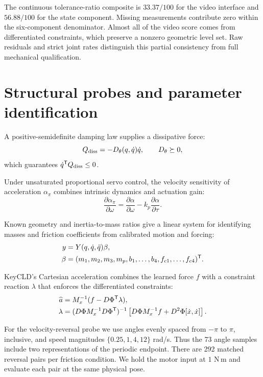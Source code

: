 The continuous tolerance-ratio composite is $33.37/100$ for the video interface and $56.88/100$ for the state component. Missing measurements contribute zero within the six-component denominator. Almost all of the video score comes from differentiated constraints, which preserve a nonzero geometric level set. Raw residuals and strict joint rates distinguish this partial consistency from full mechanical qualification.

\section{Structural probes and parameter identification}
\label{app:probes}
A positive-semidefinite damping law supplies a dissipative force:
\begin{equation}
Q_{\rm diss}=-D_\theta(q,\dot q)\dot q,\qquad D_\theta\succeq0,
\label{eq:design-dissipation}
\end{equation}
which guarantees $\dot q^{\mathsf T} Q_{\rm diss}\leq0$.

Under unsaturated proportional servo control, the velocity sensitivity of acceleration $\alpha_\pi$ combines intrinsic dynamics and actuation gain:
\begin{equation}
\frac{\partial\alpha_\pi}{\partial\omega}
=\frac{\partial\alpha}{\partial\omega}
-k_p\frac{\partial\alpha}{\partial\tau}.
\label{eq:controller-confound}
\end{equation}

Known geometry and inertia-to-mass ratios give a linear system for identifying masses and friction coefficients from calibrated motion and forcing:
\begin{equation}
\begin{aligned}
y&=Y(q,\dot q,\ddot q)\beta,\\
\beta&=(m_1,m_2,m_3,m_p,b_1,\ldots,b_4,f_{c1},\ldots,f_{c4})^{\mathsf T}.
\end{aligned}
\label{eq:identification}
\end{equation}

\begin{samepage}
KeyCLD's Cartesian acceleration combines the learned force $f$ with a constraint reaction $\lambda$ that enforces the differentiated constraints:
\begin{align}
\widehat a&=M_x^{-1}(f-D\Phi^{\mathsf T}\lambda),\\
\lambda&=(D\Phi M_x^{-1}D\Phi^{\mathsf T})^{-1}
\left[D\Phi M_x^{-1}f+D^2\Phi[\dot x,\dot x]\right].
\label{eq:keycld}
\end{align}
\end{samepage}
For the velocity-reversal probe we use angles evenly spaced from $-\pi$ to $\pi$, inclusive, and speed magnitudes $\{0.25,1,4,12\}$ rad/s. Thus the 73 angle samples include two representations of the periodic endpoint. There are 292 matched reversal pairs per friction condition. We hold the motor input at $1$ N\,m and evaluate each pair at the same physical pose.

